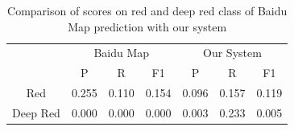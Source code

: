 
\begin{table}[]
	\small
	\centering
	\caption{Comparison of scores on red and deep red class of Baidu Map prediction with our system}
	\label{tbl:baiduf1}
	\begin{tabular}{|c|c|r|r|c|r|r|}
		\hline
		\multirow{2}{*}{} & \multicolumn{3}{c|}{Baidu Map}                                                            & \multicolumn{3}{c|}{Our System}                                                           \\ \cline{2-7} 
		& P                   & \multicolumn{1}{c|}{R} & \multicolumn{1}{c|}{F1} & P                   & \multicolumn{1}{c|}{R} & \multicolumn{1}{c|}{F1} \\ \hline
		Red               & \multicolumn{1}{r|}{0.255} & 0.110                      & 0.154                        & \multicolumn{1}{r|}{0.096} & 0.157                      & 0.119                        \\ \hline
		Deep Red          & \multicolumn{1}{r|}{0.000}      & 0.000                           & 0.000                             & \multicolumn{1}{r|}{0.003} & 0.233                      & 0.005                        \\ \hline
	\end{tabular}
\end{table}


